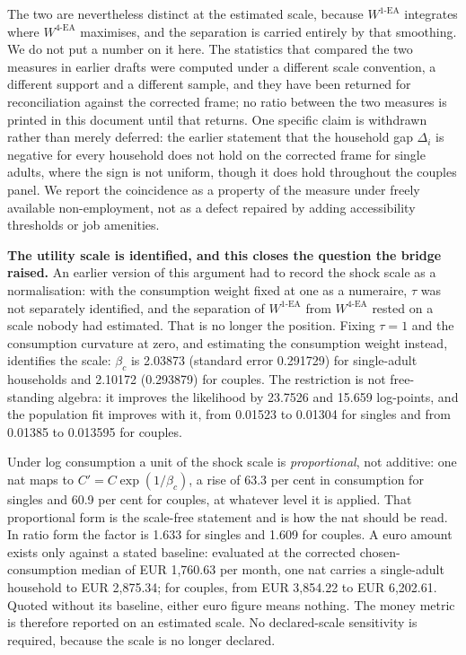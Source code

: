 \documentclass[11pt,a4paper]{article}
\begin{document}
The two are nevertheless distinct at the estimated scale, because \(W^{1\text{-EA}}\) integrates where \(W^{4\text{-EA}}\) maximises, and the separation is carried entirely by that smoothing. We do not put a number on it here. The statistics that compared the two measures in earlier drafts were computed under a different scale convention, a different support and a different sample, and they have been returned for reconciliation against the corrected frame; no ratio between the two measures is printed in this document until that returns. One specific claim is withdrawn rather than merely deferred: the earlier statement that the household gap \(\Delta_i\) is negative for every household does not hold on the corrected frame for single adults, where the sign is not uniform, though it does hold throughout the couples panel. We report the coincidence as a property of the measure under freely available non-employment, not as a defect repaired by adding accessibility thresholds or job amenities.

\textbf{The utility scale is identified, and this closes the question the bridge raised.} An earlier version of this argument had to record the shock scale as a normalisation: with the consumption weight fixed at one as a numeraire, \(\tau\) was not separately identified, and the separation of \(W^{1\text{-EA}}\) from \(W^{4\text{-EA}}\) rested on a scale nobody had estimated. That is no longer the position. Fixing \(\tau=1\) and the consumption curvature at zero, and estimating the consumption weight instead, identifies the scale: \(\beta_c\) is 2.03873 (standard error 0.291729) for single-adult households and 2.10172 (0.293879) for couples. The restriction is not free-standing algebra: it improves the likelihood by 23.7526 and 15.659 log-points, and the population fit improves with it, from 0.01523 to 0.01304 for singles and from 0.01385 to 0.013595 for couples.

Under log consumption a unit of the shock scale is \emph{proportional}, not additive: one nat maps to \(C'=C\exp(1/\beta_c)\), a rise of 63.3 per cent in consumption for singles and 60.9 per cent for couples, at whatever level it is applied. That proportional form is the scale-free statement and is how the nat should be read. In ratio form the factor is 1.633 for singles and 1.609 for couples. A euro amount exists only against a stated baseline: evaluated at the corrected chosen-consumption median of EUR 1,760.63 per month, one nat carries a single-adult household to EUR 2,875.34; for couples, from EUR 3,854.22 to EUR 6,202.61. Quoted without its baseline, either euro figure means nothing. The money metric is therefore reported on an estimated scale. No declared-scale sensitivity is required, because the scale is no longer declared.
\end{document}

